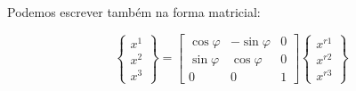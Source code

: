 \begin{enumerate}[a)]
		Podemos escrever também na forma matricial:
			
		\[
			\begin{Bmatrix}
				x^1 \\ x^2 \\ x^3
			\end{Bmatrix}
			=
			\begin{bmatrix}	
				\cos\varphi & -\sin\varphi & 0 \\
				\sin\varphi & \cos\varphi & 0 \\
				0 & 0 & 1
			\end{bmatrix}
			\begin{Bmatrix}
				x^{r1} \\ x^{r2} \\ x^{r3}
			\end{Bmatrix}							
		\]
\end{enumerate}